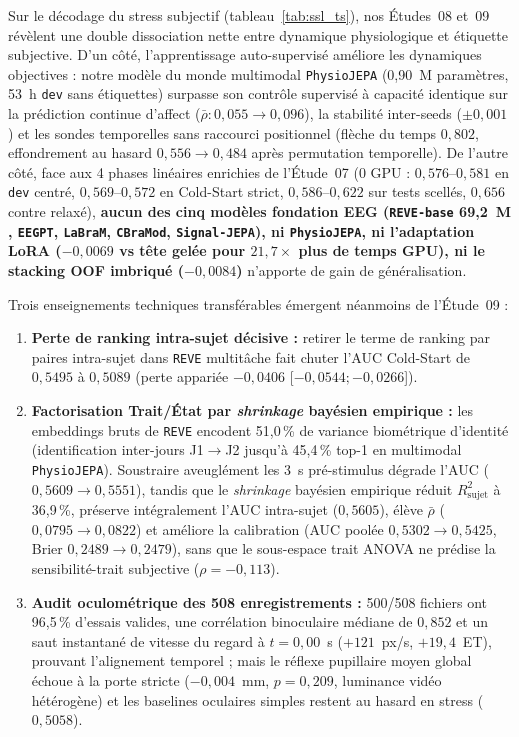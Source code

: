 \documentclass[10pt]{article}
\begin{document}
Sur le décodage du stress subjectif (tableau~\ref{tab:ssl_ts}), nos Études~08 et~09 révèlent une double dissociation nette entre dynamique physiologique et étiquette subjective. D'un côté, l'apprentissage auto-supervisé améliore les dynamiques objectives : notre modèle du monde multimodal \texttt{PhysioJEPA} (0,90~M paramètres, 53~h \texttt{dev} sans étiquettes) surpasse son contrôle supervisé à capacité identique sur la prédiction continue d'affect ($\bar{\rho} : 0{,}055 \to 0{,}096$), la stabilité inter-seeds ($\pm 0{,}001$) et les sondes temporelles sans raccourci positionnel (flèche du temps $0{,}802$, effondrement au hasard $0{,}556 \to 0{,}484$ après permutation temporelle). De l'autre côté, face aux 4 phases linéaires enrichies de l'Étude~07 (0 GPU : $0{,}576$--$0{,}581$ en \texttt{dev} centré, $0{,}569$--$0{,}572$ en Cold-Start strict, $0{,}586$--$0{,}622$ sur tests scellés, $0{,}656$ contre relaxé), \textbf{aucun des cinq modèles fondation EEG (\texttt{REVE-base} 69,2~M \cite{reve2025}, \texttt{EEGPT}, \texttt{LaBraM}, \texttt{CBraMod}, \texttt{Signal-JEPA}), ni \texttt{PhysioJEPA}, ni l'adaptation LoRA \cite{hu2022} ($-0{,}0069$ vs tête gelée pour $21{,}7\times$ plus de temps GPU), ni le stacking OOF imbriqué ($-0{,}0084$)} n'apporte de gain de généralisation.

Trois enseignements techniques transférables émergent néanmoins de l'Étude~09 :
\begin{enumerate}
\item \textbf{Perte de ranking intra-sujet décisive :} retirer le terme de ranking par paires intra-sujet dans \texttt{REVE} multitâche fait chuter l'AUC Cold-Start de $0{,}5495$ à $0{,}5089$ (perte appariée $-0{,}0406$ [$-0{,}0544 ; -0{,}0266$]).
\item \textbf{Factorisation Trait/État par \emph{shrinkage} bayésien empirique :} les embeddings bruts de \texttt{REVE} encodent 51,0\,\% de variance biométrique d'identité (identification inter-jours J1$\to$J2 jusqu'à 45,4\,\% top-1 en multimodal \texttt{PhysioJEPA}). Soustraire aveuglément les 3~s pré-stimulus dégrade l'AUC ($0{,}5609 \to 0{,}5551$), tandis que le \emph{shrinkage} bayésien empirique réduit $R^2_{\text{sujet}}$ à 36,9\,\%, préserve intégralement l'AUC intra-sujet ($0{,}5605$), élève $\bar{\rho}$ ($0{,}0795 \to 0{,}0822$) et améliore la calibration (AUC poolée $0{,}5302 \to 0{,}5425$, Brier $0{,}2489 \to 0{,}2479$), sans que le sous-espace trait ANOVA ne prédise la sensibilité-trait subjective ($\rho = -0{,}113$).
\item \textbf{Audit oculométrique des 508 enregistrements :} 500/508 fichiers ont 96,5\,\% d'essais valides, une corrélation binoculaire médiane de $0{,}852$ et un saut instantané de vitesse du regard à $t = 0{,}00$~s ($+121$~px/s, $+19{,}4$~ET), prouvant l'alignement temporel ; mais le réflexe pupillaire moyen global échoue à la porte stricte ($-0{,}004$~mm, $p = 0{,}209$, luminance vidéo hétérogène) et les baselines oculaires simples restent au hasard en stress ($0{,}5058$).
\end{enumerate}
\end{document}

